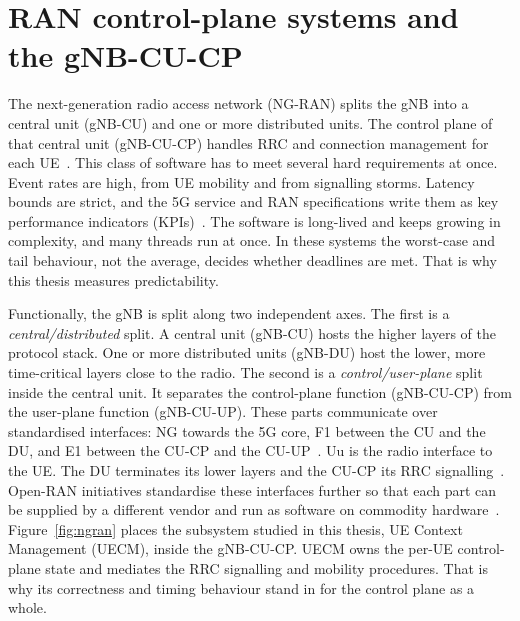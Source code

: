 \documentclass[english,oneside,a4paper,censored,csm,software-track-2020]{HYthesisML}
\begin{document}
\section{RAN control-plane systems and the gNB-CU-CP}\label{sec:ranarch}
The next-generation radio access network (NG-RAN) splits the gNB into a central unit
(gNB-CU) and one or more distributed units. The control plane of that central unit
(gNB-CU-CP) handles RRC and connection management for each
UE~\cite{3gpp38401,3gpp38300,3gpp38331}. This class of software has to meet several hard
requirements at once. Event rates are high, from UE mobility and from signalling storms.
Latency bounds are strict, and the 5G service and RAN specifications write them as key
performance indicators (KPIs)~\cite{3gpp38913,3gpp22261}. The software is long-lived and keeps
growing in complexity, and many threads run at once. In these systems the worst-case and
tail behaviour, not the average, decides whether deadlines are met. That is why this thesis
measures predictability.

Functionally, the gNB is split along two independent axes. The first is a
\emph{central/distributed} split. A central unit (gNB-CU) hosts the higher layers of the
protocol stack. One or more distributed units (gNB-DU) host the lower, more time-critical
layers close to the radio. The second is a \emph{control/user-plane} split inside the central
unit. It separates the control-plane function (gNB-CU-CP) from the user-plane function
(gNB-CU-UP). These parts communicate over standardised interfaces: NG towards the 5G core, F1
between the CU and the DU, and E1 between the CU-CP and the
CU-UP~\cite{3gpp38401,3gpp38300,3gpp38463}. Uu is the radio interface to the UE. The DU
terminates its lower layers and the CU-CP its RRC signalling~\cite{3gpp38401,3gpp38300}.
Open-RAN initiatives standardise these interfaces further so that each part can be supplied
by a different vendor and run as software on commodity hardware~\cite{polese2023oran}.
Figure~\ref{fig:ngran} places the subsystem studied in this thesis, UE Context Management
(UECM), inside the gNB-CU-CP. UECM owns the per-UE control-plane state and mediates the RRC
signalling and mobility procedures. That is why its correctness and timing behaviour stand in
for the control plane as a whole.
\end{document}
